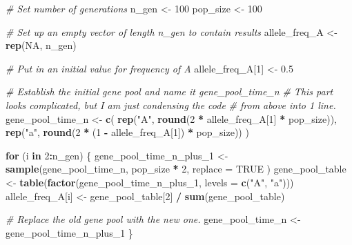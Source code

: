 \documentclass[
  a4paper]{book}
\newenvironment{Shaded}{\begin{snugshade}}{\end{snugshade}}
\newcommand{\AttributeTok}[1]{\textcolor[rgb]{0.13,0.29,0.53}{#1}}
\newcommand{\CommentTok}[1]{\textcolor[rgb]{0.56,0.35,0.01}{\textit{#1}}}
\newcommand{\ConstantTok}[1]{\textcolor[rgb]{0.56,0.35,0.01}{#1}}
\newcommand{\ControlFlowTok}[1]{\textcolor[rgb]{0.13,0.29,0.53}{\textbf{#1}}}
\newcommand{\DecValTok}[1]{\textcolor[rgb]{0.00,0.00,0.81}{#1}}
\newcommand{\FloatTok}[1]{\textcolor[rgb]{0.00,0.00,0.81}{#1}}
\newcommand{\FunctionTok}[1]{\textcolor[rgb]{0.13,0.29,0.53}{\textbf{#1}}}
\newcommand{\NormalTok}[1]{#1}
\newcommand{\OtherTok}[1]{\textcolor[rgb]{0.56,0.35,0.01}{#1}}
\newcommand{\SpecialCharTok}[1]{\textcolor[rgb]{0.81,0.36,0.00}{\textbf{#1}}}
\newcommand{\StringTok}[1]{\textcolor[rgb]{0.31,0.60,0.02}{#1}}
\begin{document}
\begin{Shaded}
\begin{Highlighting}[]
\CommentTok{\# Set number of generations}
\NormalTok{n\_gen }\OtherTok{\textless{}{-}} \DecValTok{100}
\NormalTok{pop\_size }\OtherTok{\textless{}{-}} \DecValTok{100}

\CommentTok{\# Set up an empty vector of length n\_gen to contain results}
\NormalTok{allele\_freq\_A }\OtherTok{\textless{}{-}} \FunctionTok{rep}\NormalTok{(}\ConstantTok{NA}\NormalTok{, n\_gen)}

\CommentTok{\# Put in an initial value for frequency of A}
\NormalTok{allele\_freq\_A[}\DecValTok{1}\NormalTok{] }\OtherTok{\textless{}{-}} \FloatTok{0.5}

\CommentTok{\# Establish the initial gene pool and name it gene\_pool\_time\_n}
\CommentTok{\# This part looks complicated, but I am just condensing the code }
\CommentTok{\# from above into 1 line.}
\NormalTok{gene\_pool\_time\_n }\OtherTok{\textless{}{-}} \FunctionTok{c}\NormalTok{(}
  \FunctionTok{rep}\NormalTok{(}\StringTok{"A"}\NormalTok{, }\FunctionTok{round}\NormalTok{(}\DecValTok{2} \SpecialCharTok{*}\NormalTok{ allele\_freq\_A[}\DecValTok{1}\NormalTok{] }\SpecialCharTok{*}\NormalTok{ pop\_size)),}
  \FunctionTok{rep}\NormalTok{(}\StringTok{"a"}\NormalTok{, }\FunctionTok{round}\NormalTok{(}\DecValTok{2} \SpecialCharTok{*}\NormalTok{ (}\DecValTok{1} \SpecialCharTok{{-}}\NormalTok{ allele\_freq\_A[}\DecValTok{1}\NormalTok{]) }\SpecialCharTok{*}\NormalTok{ pop\_size))}
\NormalTok{)}

\ControlFlowTok{for}\NormalTok{ (i }\ControlFlowTok{in} \DecValTok{2}\SpecialCharTok{:}\NormalTok{n\_gen) \{}
\NormalTok{  gene\_pool\_time\_n\_plus\_1 }\OtherTok{\textless{}{-}} \FunctionTok{sample}\NormalTok{(gene\_pool\_time\_n,}
\NormalTok{    pop\_size }\SpecialCharTok{*} \DecValTok{2}\NormalTok{,}
    \AttributeTok{replace =} \ConstantTok{TRUE}
\NormalTok{  )}
\NormalTok{  gene\_pool\_table }\OtherTok{\textless{}{-}} \FunctionTok{table}\NormalTok{(}\FunctionTok{factor}\NormalTok{(gene\_pool\_time\_n\_plus\_1, }
                                  \AttributeTok{levels =} \FunctionTok{c}\NormalTok{(}\StringTok{"A"}\NormalTok{, }\StringTok{"a"}\NormalTok{)))}
\NormalTok{  allele\_freq\_A[i] }\OtherTok{\textless{}{-}}\NormalTok{ gene\_pool\_table[}\DecValTok{2}\NormalTok{] }\SpecialCharTok{/} \FunctionTok{sum}\NormalTok{(gene\_pool\_table)}

  \CommentTok{\# Replace the old gene pool with the new one.}
\NormalTok{  gene\_pool\_time\_n }\OtherTok{\textless{}{-}}\NormalTok{ gene\_pool\_time\_n\_plus\_1}
\NormalTok{\}}
\end{Highlighting}
\end{Shaded}
\end{document}

